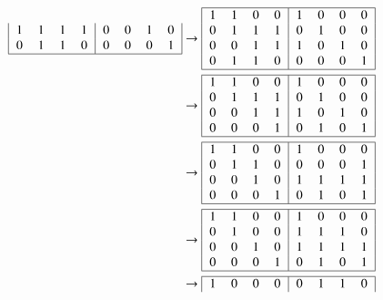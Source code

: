 \begin{loesung}
\begin{teilaufgaben}
\begin{align*}
\begin{tabular}{|>{$}c<{$}>{$}c<{$}>{$}c<{$}>{$}c<{$}|>{$}c<{$}>{$}c<{$}>{$}c<{$}>{$}c<{$}|}
   1 & 1 & 1 & 1 &  0 & 0 & 1 & 0 \\
   0 & 1 & 1 & 0 &  0 & 0 & 0 & 1 \\
\hline
\end{tabular}
&\to
\begin{tabular}{|>{$}c<{$}>{$}c<{$}>{$}c<{$}>{$}c<{$}|>{$}c<{$}>{$}c<{$}>{$}c<{$}>{$}c<{$}|}
\hline
   1 & 1 & 0 & 0 &  1 & 0 & 0 & 0 \\
   0 & 1 & 1 & 1 &  0 & 1 & 0 & 0 \\
   0 & 0 & 1 & 1 &  1 & 0 & 1 & 0 \\
   0 & 1 & 1 & 0 &  0 & 0 & 0 & 1 \\
\hline
\end{tabular}
\\
&\to
\begin{tabular}{|>{$}c<{$}>{$}c<{$}>{$}c<{$}>{$}c<{$}|>{$}c<{$}>{$}c<{$}>{$}c<{$}>{$}c<{$}|}
\hline
   1 & 1 & 0 & 0 &  1 & 0 & 0 & 0 \\
   0 & 1 & 1 & 1 &  0 & 1 & 0 & 0 \\
   0 & 0 & 1 & 1 &  1 & 0 & 1 & 0 \\
   0 & 0 & 0 & 1 &  0 & 1 & 0 & 1 \\
\hline
\end{tabular}
\\
&\to
\begin{tabular}{|>{$}c<{$}>{$}c<{$}>{$}c<{$}>{$}c<{$}|>{$}c<{$}>{$}c<{$}>{$}c<{$}>{$}c<{$}|}
\hline
   1 & 1 & 0 & 0 &  1 & 0 & 0 & 0 \\
   0 & 1 & 1 & 0 &  0 & 0 & 0 & 1 \\
   0 & 0 & 1 & 0 &  1 & 1 & 1 & 1 \\
   0 & 0 & 0 & 1 &  0 & 1 & 0 & 1 \\
\hline
\end{tabular}
\\
&\to
\begin{tabular}{|>{$}c<{$}>{$}c<{$}>{$}c<{$}>{$}c<{$}|>{$}c<{$}>{$}c<{$}>{$}c<{$}>{$}c<{$}|}
\hline
   1 & 1 & 0 & 0 &  1 & 0 & 0 & 0 \\
   0 & 1 & 0 & 0 &  1 & 1 & 1 & 0 \\
   0 & 0 & 1 & 0 &  1 & 1 & 1 & 1 \\
   0 & 0 & 0 & 1 &  0 & 1 & 0 & 1 \\
\hline
\end{tabular}
\\
&\to
\begin{tabular}{|>{$}c<{$}>{$}c<{$}>{$}c<{$}>{$}c<{$}|>{$}c<{$}>{$}c<{$}>{$}c<{$}>{$}c<{$}|}
\hline
   1 & 0 & 0 & 0 &  0 & 1 & 1 & 0 \\

\end{tabular}
\end{align*}
\end{teilaufgaben}
\end{loesung}
